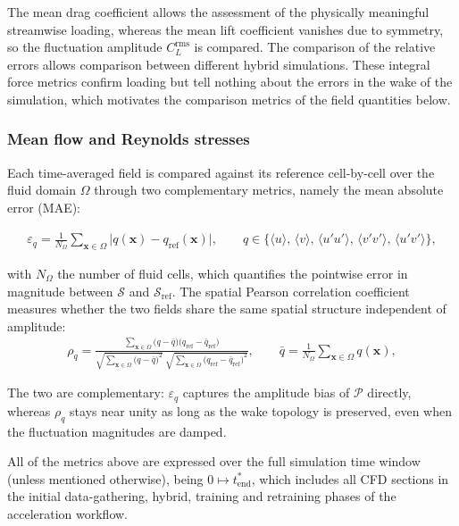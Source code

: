 The mean drag coefficient allows the assessment of the physically meaningful streamwise loading, whereas the mean lift coefficient vanishes due to symmetry, so the fluctuation amplitude $C_L^\text{rms}$ is compared. The comparison of the relative errors allows comparison between different hybrid simulations. These integral force metrics confirm loading but tell nothing about the errors in the wake of the simulation, which motivates the comparison metrics of the field quantities below. 

\subsubsection{Mean flow and Reynolds stresses}
 Each time-averaged field is compared against its reference cell-by-cell over the fluid domain $\Omega$ through two complementary metrics, namely the mean absolute error (MAE):
 
\begin{align}
\varepsilon_q
  = \frac{1}{N_\Omega}\sum_{\mathbf{x}\in\Omega}
    \bigl\lvert q(\mathbf{x}) - q_\text{ref}(\mathbf{x}) \bigr\rvert,
\qquad
q \in \bigl\{ \langle u\rangle,\, \langle v\rangle,\,
              \langle u'u'\rangle,\, \langle v'v'\rangle,\,
              \langle u'v'\rangle \bigr\},
\end{align}
      
with $N_\Omega$ the number of fluid cells, which quantifies the pointwise error in magnitude between $\mathcal{S}$ and $\mathcal{S}_\text{ref}$. The spatial Pearson correlation coefficient measures whether the two fields share the same spatial structure independent of amplitude:
\begin{align}
\rho_q
  = \frac{\sum_{\mathbf{x}\in\Omega}
           \bigl(q - \bar{q}\bigr)
           \bigl(q_\text{ref} - \bar{q}_\text{ref}\bigr)}
         {\sqrt{\sum_{\mathbf{x}\in\Omega}\bigl(q - \bar{q}\bigr)^2}\;
          \sqrt{\sum_{\mathbf{x}\in\Omega}
                \bigl(q_\text{ref} - \bar{q}_\text{ref}\bigr)^2}},
\qquad
\bar{q} = \frac{1}{N_\Omega}\sum_{\mathbf{x}\in\Omega} q(\mathbf{x}),
\end{align}
     
The two are complementary: $\varepsilon_q$ captures the amplitude bias of $\mathcal{P}$ directly, whereas $\rho_q$ stays near unity as long as the wake topology is preserved, even when the fluctuation magnitudes are damped.


All of the metrics above are expressed over the full simulation time window (unless mentioned otherwise), being $0 \mapsto t^*_\text{end}$, which includes all CFD sections in the initial data-gathering, hybrid, training and retraining phases of the acceleration workflow. 

